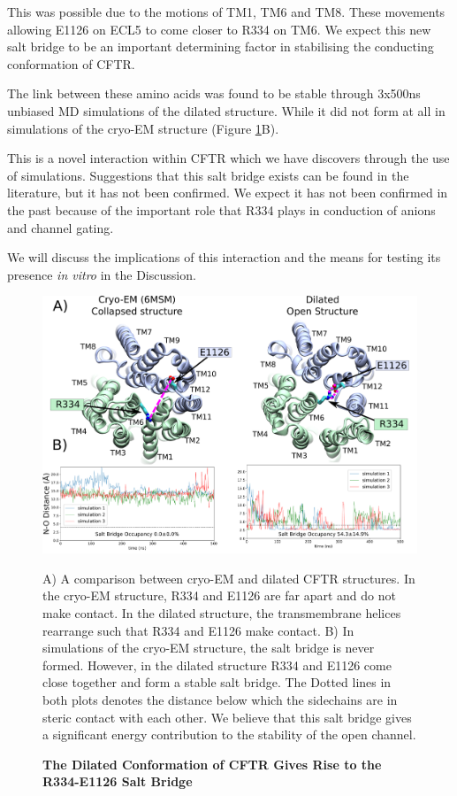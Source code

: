 This was possible due to the motions of TM1, TM6 and TM8. These movements allowing E1126 on ECL5 to come closer to R334 on TM6. We expect this new salt bridge to be an important determining factor in stabilising the conducting conformation of CFTR.  

The link between these amino acids was found to be stable through 3x500ns unbiased MD simulations of the dilated structure. While it did not form at all in simulations of the cryo-EM structure (Figure \ref{salt_bridge_fig}B).

This is a novel interaction within CFTR which we have discovers through the use of simulations. Suggestions that this salt bridge exists can be found in the literature, but it has not been confirmed. We expect it has not been confirmed in the past because of the important role that R334 plays in conduction of anions and channel gating. 

We will discuss the implications of this interaction and the means for testing its presence \textit{in vitro} in the Discussion.

\begin{figure}
	\begin{center}
		\includegraphics[width=1\textwidth]{figures/opening/salt_bridge_E1126_R334_figure.pdf}
	\end{center}
	\captionsetup{singlelinecheck = false, justification=raggedright}
	\caption[The Dilated Conformation of CFTR Gives Rise to the R334-E1126 Salt Bridge] {\textbf{The Dilated Conformation of CFTR Gives Rise to the R334-E1126 Salt Bridge}}{A) A comparison between cryo-EM and dilated CFTR structures. In the cryo-EM structure, R334 and E1126 are far apart and do not make contact. In the dilated structure, the transmembrane helices rearrange such that R334 and E1126 make contact. B) In simulations of the cryo-EM structure, the salt bridge is never formed. However, in the dilated structure R334 and E1126 come close together and form a stable salt bridge. The Dotted lines  in both plots denotes the distance below which the sidechains are in steric contact with each other. We believe that this salt bridge gives a significant energy contribution to the stability of the open channel. }
	\label{salt_bridge_fig}
\end{figure}


